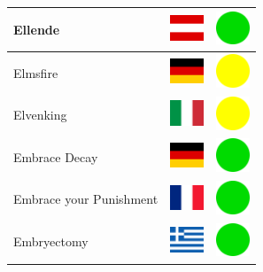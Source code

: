 \documentclass[12pt, a4paper, twoside]{report}
\begin{document}
\begin{center}
\begin{longtable}{|p{5cm}|p{2cm}|p{2cm}|}
 Ellende                                                    & \includegraphics[width=1cm]{../4x3/at} &   \includegraphics[width=1cm]{../likes/y} \\ \hline
 Elmsfire                                                   & \includegraphics[width=1cm]{../4x3/de} &   \includegraphics[width=1cm]{../likes/m} \\ \hline
 Elvenking                                                  & \includegraphics[width=1cm]{../4x3/it} &   \includegraphics[width=1cm]{../likes/m} \\ \hline
 Embrace Decay                                              & \includegraphics[width=1cm]{../4x3/de} &   \includegraphics[width=1cm]{../likes/y} \\ \hline
 Embrace your Punishment                                    & \includegraphics[width=1cm]{../4x3/fr} &   \includegraphics[width=1cm]{../likes/y} \\ \hline
 Embryectomy                                                & \includegraphics[width=1cm]{../4x3/gr} &   \includegraphics[width=1cm]{../likes/y} \\ \hline

\end{longtable}
\end{center}
\end{document}
